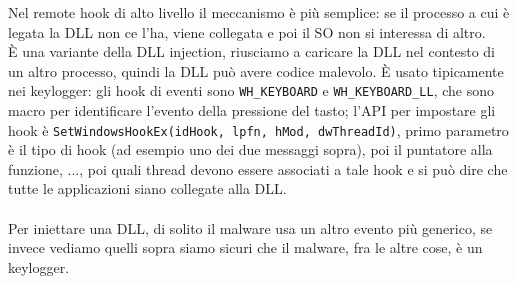 \documentclass[12pt, oneside]{extbook}
\begin{document}
Nel remote hook di alto livello il meccanismo è più semplice: se il processo a cui è legata la DLL non ce l'ha, viene collegata e poi il SO non si interessa di altro.\\È una variante della DLL injection, riusciamo a caricare la DLL nel contesto di un altro processo, quindi la DLL può avere codice malevolo. È usato tipicamente nei keylogger: gli hook di eventi sono \texttt{WH\_KEYBOARD} e \texttt{WH\_KEYBOARD\_LL}, che sono macro per identificare l'evento della pressione del tasto; l'API per impostare gli hook è \texttt{SetWindowsHookEx(idHook, lpfn, hMod, dwThreadId)}, primo parametro è il tipo di hook (ad esempio uno dei due messaggi sopra), poi il puntatore alla funzione, ..., poi quali thread devono essere associati a tale hook e si può dire che tutte le applicazioni siano collegate alla DLL.\\\\Per iniettare una DLL, di solito il malware usa un altro evento più generico, se invece vediamo quelli sopra siamo sicuri che il malware, fra le altre cose, è un keylogger.
\end{document}
